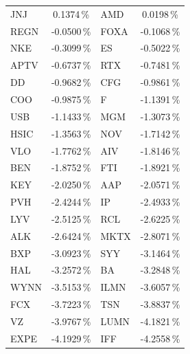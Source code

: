 \begin{longtable}{l c | l c}
    JNJ    & 0.1374\,\%             & AMD    & 0.0198\,\%                                    \\
    REGN   & -0.0500\,\%            & FOXA   & -0.1068\,\%                                   \\
    NKE    & -0.3099\,\%            & ES     & -0.5022\,\%                                   \\
    APTV   & -0.6737\,\%            & RTX    & -0.7481\,\%                                   \\
    DD     & -0.9682\,\%            & CFG    & -0.9861\,\%                                   \\
    COO    & -0.9875\,\%            & F      & -1.1391\,\%                                   \\
    USB    & -1.1433\,\%            & MGM    & -1.3073\,\%                                   \\
    HSIC   & -1.3563\,\%            & NOV    & -1.7142\,\%                                   \\
    VLO    & -1.7762\,\%            & AIV    & -1.8146\,\%                                   \\
    BEN    & -1.8752\,\%            & FTI    & -1.8921\,\%                                   \\
    KEY    & -2.0250\,\%            & AAP    & -2.0571\,\%                                   \\
    PVH    & -2.4244\,\%            & IP     & -2.4933\,\%                                   \\
    LYV    & -2.5125\,\%            & RCL    & -2.6225\,\%                                   \\
    ALK    & -2.6424\,\%            & MKTX   & -2.8071\,\%                                   \\
    BXP    & -3.0923\,\%            & SYY    & -3.1464\,\%                                   \\
    HAL    & -3.2572\,\%            & BA     & -3.2848\,\%                                   \\
    WYNN   & -3.5153\,\%            & ILMN   & -3.6057\,\%                                   \\
    FCX    & -3.7223\,\%            & TSN    & -3.8837\,\%                                   \\
    VZ     & -3.9767\,\%            & LUMN   & -4.1821\,\%                                   \\
    EXPE   & -4.1929\,\%            & IFF    & -4.2558\,\%                                   \\

\end{longtable}
